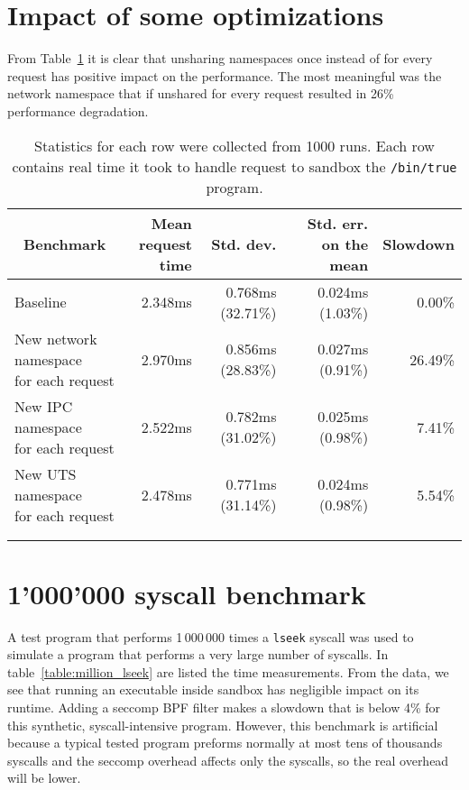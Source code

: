 \documentclass[en]{pracamgr}
\begin{document}
\section{Impact of some optimizations}

From Table~\ref{table:optimization_impact} it is clear that unsharing namespaces once instead of for every request has positive impact on the performance. The most meaningful was the network namespace that if unshared for every request resulted in 26\% performance degradation.

\begin{small}
\begin{longtable}{|l|r|r|r|r|}
\hline
\multicolumn{1}{|c|}{Benchmark} & \makecell{Mean\\request time} & Std. dev. & Std. err. on the mean & \multicolumn{1}{c|}{Slowdown} \\
\hline
Baseline                                              & 2.348ms & 0.768ms (32.71\%) & 0.024ms (1.03\%) & 0.00\% \\
\hline
\makecell{New network namespace \\ for each request}  & 2.970ms & 0.856ms (28.83\%) & 0.027ms (0.91\%) & 26.49\% \\
\hline
\makecell{New IPC namespace \\ for each request}      & 2.522ms & 0.782ms (31.02\%) & 0.025ms (0.98\%) & 7.41\% \\
\hline
\makecell{New UTS namespace \\ for each request}      & 2.478ms & 0.771ms (31.14\%) & 0.024ms (0.98\%) & 5.54\% \\
\hline
\multicolumn{1}{c}{}\\ %
\caption{Statistics for each row were collected from 1000 runs. Each row contains real time it took to handle request to sandbox the \texttt{/bin/true} program.}
\label{table:optimization_impact}
\end{longtable}
\end{small}

\iffalse
\section{1'000'000 syscall benchmark}

A test program that performs 1\,000\,000 times a \texttt{lseek} syscall was used to simulate a program that performs a very large number of syscalls. In table~\ref{table:million_lseek} are listed the time measurements. From the data, we see that running an executable inside sandbox has negligible impact on its runtime. Adding a seccomp BPF filter makes a slowdown that is below 4\% for this synthetic, syscall-intensive program. However, this benchmark is artificial because a typical tested program preforms normally at most tens of thousands syscalls and the seccomp overhead affects only the syscalls, so the real overhead will be lower.
\end{document}
